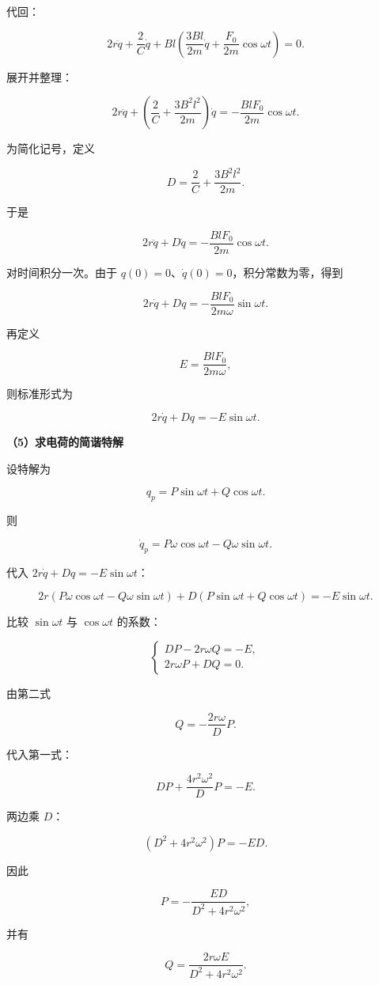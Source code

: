 \documentclass[12pt,a4paper,UTF8]{ctexart}
\begin{document}
代回：

\[
2r\ddot q+\frac{2}{C}\dot q
+Bl\left(\frac{3Bl}{2m}\dot q+\frac{F_0}{2m}\cos\omega t\right)=0.
\]

展开并整理：

\[
2r\ddot q+\left(\frac2C+\frac{3B^2l^2}{2m}\right)\dot q
=-\frac{BlF_0}{2m}\cos\omega t.
\]

为简化记号，定义

\[
\boxed{D=\frac2C+\frac{3B^2l^2}{2m}}.
\]

于是

\[
2r\ddot q+D\dot q=-\frac{BlF_0}{2m}\cos\omega t.
\]

对时间积分一次。由于 \(q(0)=0\)、\(\dot q(0)=0\)，积分常数为零，得到

\[
2r\dot q+Dq=-\frac{BlF_0}{2m\omega}\sin\omega t.
\]

再定义

\[
\boxed{E=\frac{BlF_0}{2m\omega}},
\]

则标准形式为

\[
\boxed{2r\dot q+Dq=-E\sin\omega t}.
\]

\textbf{（5）求电荷的简谐特解}

设特解为

\[q_p=P\sin\omega t+Q\cos\omega t.\]

则

\[\dot q_p=P\omega\cos\omega t-Q\omega\sin\omega t.\]

代入 \(2r\dot q+Dq=-E\sin\omega t\)：

\[
2r(P\omega\cos\omega t-Q\omega\sin\omega t)
+D(P\sin\omega t+Q\cos\omega t)
=-E\sin\omega t.
\]

比较 \(\sin\omega t\) 与 \(\cos\omega t\) 的系数：

\[
\begin{cases}
DP-2r\omega Q=-E,\\
2r\omega P+DQ=0.
\end{cases}
\]

由第二式

\[Q=-\frac{2r\omega}{D}P.\]

代入第一式：

\[
DP+\frac{4r^2\omega^2}{D}P=-E.
\]

两边乘 \(D\)：

\[
(D^2+4r^2\omega^2)P=-ED.
\]

因此

\[
\boxed{P=-\frac{ED}{D^2+4r^2\omega^2}},
\]

并有

\[
\boxed{Q=\frac{2r\omega E}{D^2+4r^2\omega^2}}.
\]
\end{document}

